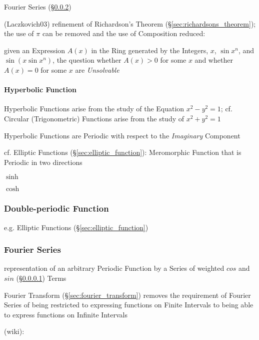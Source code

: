 \fist Fourier Series (\S\ref{sec:fourier_series})

(Laczkovich03) refinement of Richardson's Theorem
(\S\ref{sec:richardsons_theorem}); the use of $\pi$ can be removed and the use
of Composition reduced:

given an Expression $A(x)$ in the Ring generated by the Integers, $x$, $\sin
x^n$, and $\sin(x \sin x^n)$, the question whether $A(x) > 0$ for some $x$ and
whether $A(x) = 0$ for some $x$ are \emph{Unsolvable}



\paragraph{Hyperbolic Function}\label{sec:trigonometric_function}\hfill

Hyperbolic Functions arise from the study of the Equation $x^2 - y^2 = 1$; cf.
Circular (Trigonometric) Functions arise from the study of $x^2 + y^2 = 1$

Hyperbolic Functions are Periodic with respect to the \emph{Imaginary}
Component

cf. Elliptic Functions (\S\ref{sec:elliptic_function}): Meromorphic Function
that is Periodic in two directions

$\sinh$

$\cosh$



\subsubsection{Double-periodic Function}\label{sec:double_periodic}

e.g. Elliptic Functions (\S\ref{sec:elliptic_function})



\subsubsection{Fourier Series}\label{sec:fourier_series}

representation of an arbitrary Periodic Function by a Series of weighted $cos$
and $sin$ (\S\ref{sec:trigonometric_function}) Terms

\fist Fourier Transform (\S\ref{sec:fourier_transform}) removes the requirement
of Fourier Series of being restricted to expressing functions on Finite
Intervals to being able to express functions on Infinite Intervals

(wiki):

